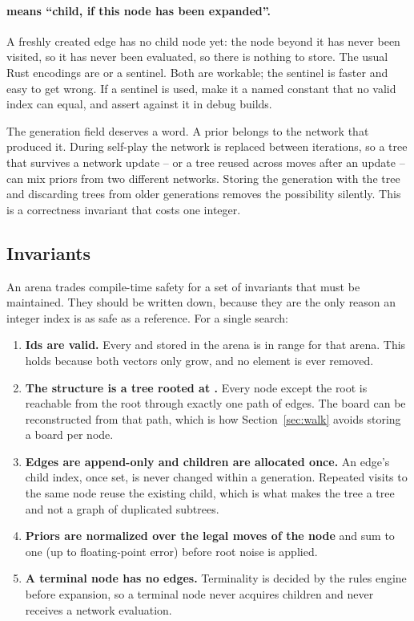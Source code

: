 \paragraph{ means ``child, if this node has been expanded''.} A
freshly created edge has no child node yet: the node beyond it has never been
visited, so it has never been evaluated, so there is nothing to store. The usual
Rust encodings are  or a sentinel. Both are workable; the
sentinel is faster and easy to get wrong. If a sentinel is used, make it a named
constant that no valid index can equal, and assert against it in debug builds.

The generation field deserves a word. A prior belongs to the network that
produced it. During self-play the network is replaced between iterations, so a
tree that survives a network update -- or a tree reused across moves after an
update -- can mix priors from two different networks. Storing the generation with
the tree and discarding trees from older generations removes the possibility
silently. This is a correctness invariant that costs one integer.

\subsection{Invariants}
\label{sec:invariants}

An arena trades compile-time safety for a set of invariants that must be
maintained. They should be written down, because they are the only reason an
integer index is as safe as a reference. For a single search:

\begin{enumerate}
  \item \textbf{Ids are valid.} Every  and  stored in the
        arena is in range for that arena. This holds because both vectors only
        grow, and no element is ever removed.
  \item \textbf{The structure is a tree rooted at .} Every node except
        the root is reachable from the root through exactly one path of edges.
        The board can be reconstructed from that path, which is how
        Section~\ref{sec:walk} avoids storing a board per node.
  \item \textbf{Edges are append-only and children are allocated once.} An edge's
        child index, once set, is never changed within a generation. Repeated
        visits to the same node reuse the existing child, which is what makes the
        tree a tree and not a graph of duplicated subtrees.
  \item \textbf{Priors are normalized over the legal moves of the node} and sum to
        one (up to floating-point error) before root noise is applied.
  \item \textbf{A terminal node has no edges.} Terminality is decided by the
        rules engine before expansion, so a terminal node never acquires children
        and never receives a network evaluation.
\end{enumerate}


